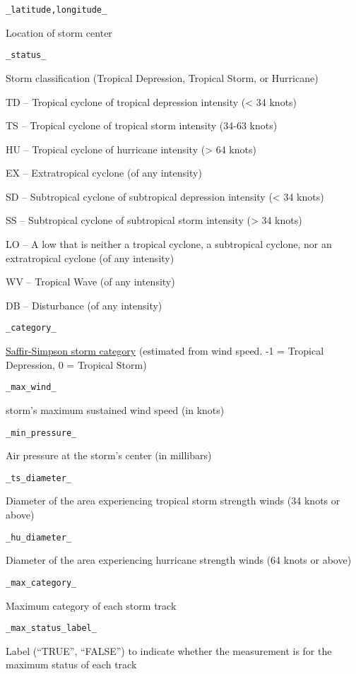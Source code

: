 \documentclass[]{book}
\begin{document}
\texttt{\_latitude,longitude\_}

Location of storm center

\texttt{\_status\_}

Storm classification (Tropical Depression, Tropical Storm, or Hurricane)

TD -- Tropical cyclone of tropical depression intensity (\textless{} 34 knots)

TS -- Tropical cyclone of tropical storm intensity (34-63 knots)

HU -- Tropical cyclone of hurricane intensity (\textgreater{} 64 knots)

EX -- Extratropical cyclone (of any intensity)

SD -- Subtropical cyclone of subtropical depression intensity (\textless{} 34 knots)

SS -- Subtropical cyclone of subtropical storm intensity (\textgreater{} 34 knots)

LO -- A low that is neither a tropical cyclone, a subtropical cyclone, nor an extratropical cyclone (of any intensity)

WV -- Tropical Wave (of any intensity)

DB -- Disturbance (of any intensity)

\texttt{\_category\_}

\href{https://www.nhc.noaa.gov/aboutsshws.php}{Saffir-Simpson storm category} (estimated from wind speed. -1 = Tropical Depression, 0 = Tropical Storm)

\texttt{\_max\_wind\_}

storm's maximum sustained wind speed (in knots)

\texttt{\_min\_pressure\_}

Air pressure at the storm's center (in millibars)

\texttt{\_ts\_diameter\_}

Diameter of the area experiencing tropical storm strength winds (34 knots or above)

\texttt{\_hu\_diameter\_}

Diameter of the area experiencing hurricane strength winds (64 knots or above)

\texttt{\_max\_category\_}

Maximum category of each storm track

\texttt{\_max\_status\_label\_}

Label (``TRUE'', ``FALSE'') to indicate whether the measurement is for the maximum status of each track
\end{document}
